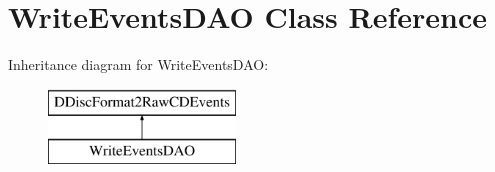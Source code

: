 \hypertarget{class_write_events_d_a_o}{}\section{Write\+Events\+D\+AO Class Reference}
\label{class_write_events_d_a_o}
Inheritance diagram for Write\+Events\+D\+AO\+:\begin{figure}[H]
\begin{center}
\leavevmode
\includegraphics[height=2.000000cm]{class_write_events_d_a_o}
\end{center}
\end{figure}
